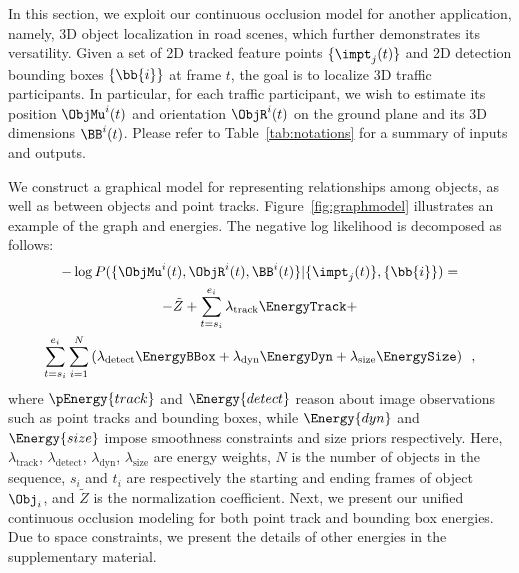



In this section, we exploit our continuous occlusion model for another application, namely, 3D object localization in road scenes, which further demonstrates its versatility. Given a set of 2D tracked feature points $\{\impt_j(t)\}$ and 2D detection bounding boxes $\{\bb{i}\}$ at frame $t$, the goal is to localize 3D traffic participants. In particular, for each traffic participant, we wish to estimate its position $\ObjMu^i(t)$ and orientation $\ObjR^i(t)$ on the ground plane and its 3D dimensions $\BB^i(t)$. Please refer to Table~\ref{tab:notations} for a summary of inputs and outputs. 

We construct a graphical model for representing relationships among objects, as well as between objects and point tracks. Figure~\ref{fig:graphmodel} illustrates an example of the graph and energies. The negative log likelihood is decomposed as follows:
%
\begin{multline*}
  -\log{P(\{ \ObjMu^i(t) , \ObjR^i(t) , \BB^i(t) \} | \{\impt_j(t)\} , \{\bb{i}\} )} = \\
  -\tilde{Z} 
  + \sum_{t=s_i}^{e_i} \lambda_{\text{track}}\EnergyTrack
  + \\ 
  \sum_{t=s_i}^{e_i} \sum_{i=1}^N  
  \left(
    \lambda_{\text{detect}}\EnergyBBox
    + \lambda_{\text{dyn}}\EnergyDyn    
    + \lambda_{\text{size}}\EnergySize
  \right)
  \enspace,
\end{multline*}
%
where $\pEnergy{track}$ and $\Energy{detect}$ reason about image observations such as point tracks and bounding boxes, while $\Energy{dyn}$  and $\Energy{size}$ impose smoothness constraints and size priors respectively. Here, $\lambda_{\text{track}}$, $\lambda_{\text{detect}}$, $\lambda_{\text{dyn}}$, $\lambda_{\text{size}}$ are energy weights, $N$ is the number of objects in the sequence, $s_i$ and $t_i$ are respectively the starting and ending frames of object $\Obj_i$, and $\tilde{Z}$ is the normalization coefficient. Next, we present our unified continuous occlusion modeling for both point track and bounding box energies. Due to space constraints, we present the details of other energies in the supplementary material.

